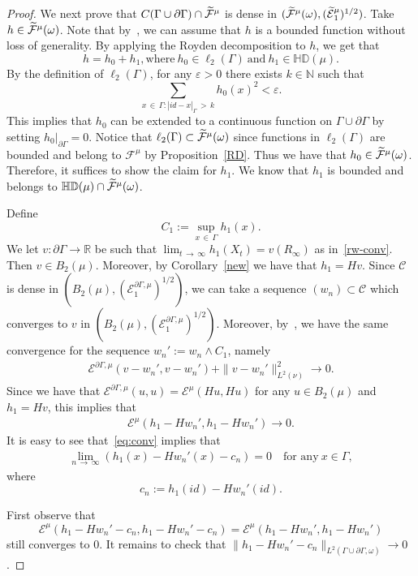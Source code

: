 \documentclass[10pt]{amsart}
\theoremstyle{definition}\newtheorem{defi}[theo]{Definition}\newtheorem{rema}[theo]{Remark}\newtheorem{exam}[theo]{Example}\newtheorem{exem}[theo]{Example}\newtheorem{nota}[theo]{Notation}
\newcommand{\ce}{\mathcal{E}}
\newcommand{\cf}{\mathcal{F}}
\newcommand{\cC}{\mathcal{C}}
\newcommand{\br}{\mathbb{R}}
\newcommand{\bn}{\mathbb{N}}
\newcommand{\bHD}{\mathbb{HD}}
\newcommand*{\MK}{\mkern 2mu}
\let\oldtilde\tilde
\renewcommand*{\tilde}[1]{\mathchoice{\widetilde{#1}}{\widetilde{#1}}{\oldtilde{#1}}{\oldtilde{#1}}}
\begin{document}
\begin{proof}
We next prove that $C(\Gamma\cup\partial\Gamma)\cap\tilde\cf^{\mu}$ is dense in $(\tilde\cf^{\mu}(\omega), (\tilde\ce^{\mu}_1)^{1/2})$. Take $h \in\tilde\cf^{\mu}(\omega)$. Note that by~\cite[Theorem~1.4.2$\MK$(i), (iii)]{FOT}, we can assume that $h$ is a bounded function without loss of generality. By applying the Royden decomposition to $h$, we get that
\[
h=h_0+h_1,\text{where}\ h_0\in\ell_2(\Gamma)\ \text{and}\ h_1\in\bHD(\mu).
\]
By the definition of $\ell_2(\Gamma)$, for any $\varepsilon>0$ there exists $k\in\bn$ such that
\[
\sum_{x\,\in\,\Gamma:|id-x|_{\Gamma}\,>\,k}h_0(x)^2<\varepsilon.
\]
This implies that $h_0$ can be extended to a continuous function on $\Gamma\cup\partial\Gamma$ by setting $h_0|_{\partial\Gamma}=0$. Notice that $\ell_2(\Gamma)\subset\tilde\cf^{\mu}(\omega)$ since functions in $\ell_2(\Gamma)$ are bounded and belong to $\cf^{\mu}$ by Proposition~\ref{RD}. Thus we have that $h_0\in\tilde\cf^{\mu}(\omega)$. Therefore, it suffices to show the claim for $h_1$. We know that $h_1$ is bounded and belongs to $\bHD(\mu)\cap\tilde\cf^{\mu}(\omega)$.

Define
\[
C_1:=\sup_{x\,\in\,\Gamma}h_1(x).
\]
We let $v:\partial\Gamma\rightarrow\br$ be such that $\lim_{t\,\to\,\infty}h_1(X_t)=v(R_\infty)$ as in~\eqref{rw-conv}. Then $v\in B_2(\mu)$. Moreover, by Corollary~\ref{new} we have that $h_1=Hv.$ Since $\cC$ is dense in $(B_2(\mu),(\ce^{\partial\Gamma,\mu}_1)^{1/2})$, we can take a sequence $(w_n)\subset\cC$ which converges to $v$ in $(B_2(\mu),(\ce^{\partial\Gamma,\mu}_1)^{1/2})$. Moreover, by~\cite[Theorem~1.4.2$\MK$(v)]{FOT}, we have the same convergence for the sequence $w_n':= w_n\wedge C_1$, namely
\begin{align}\label{e1to0}
\ce^{\partial\Gamma,\mu}\left(v-w_n',v-w_n'\right)+\|v-w_n'\|^2_{L^2(\nu)}\rightarrow0.
\end{align}
Since we have that $\ce^{\partial\Gamma,\mu}(u,u)=\ce^{\mu}(Hu,Hu)$ for any $u\in B_2(\mu)$ and $h_1=Hv$, this implies that
\begin{align}\label{eq:conv}
\ce^{\mu}\left(h_1-Hw_n',h_1-Hw_n'\right)\rightarrow0.
\end{align}
It is easy to see that~\eqref{eq:conv} implies that
\begin{align}\label{p-w-con}
\lim_{n\,\to\,\infty}\left(h_1(x)-Hw_n'(x)-c_n\right)=0\quad \text{for\ any}\ x\in\Gamma,
\end{align}
where
\[
c_n:=h_1(id)-Hw_n'(id).
\]

First observe that
\[
\ce^{\mu}\left(h_1-Hw_n'-c_n,h_1-Hw_n'-c_n\right)=\ce^{\mu}\left(h_1-Hw_n',h_1-Hw_n'\right)
\]
still converges to $0$.
It remains to check that $\|h_1-Hw_n'-c_n\|_{L^2(\Gamma\cup\partial\Gamma,\omega)}\rightarrow0$.


\end{proof}
\end{document}
